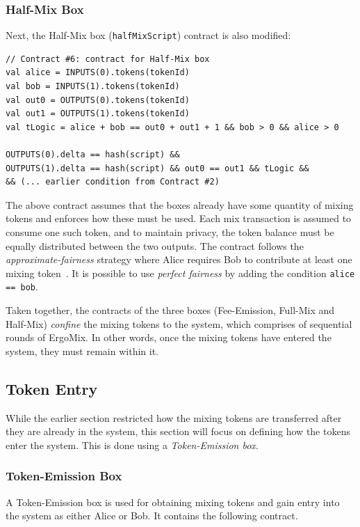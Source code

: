 \documentclass[11pt]{article}
\newcommand{\mixname}{ErgoMix\xspace}
\begin{document}
\subsubsection{Half-Mix Box}
Next, the Half-Mix box (\texttt{halfMixScript}) contract is also modified:
{\small
\begin{Verbatim}[frame=single]
// Contract #6: contract for Half-Mix box
val alice = INPUTS(0).tokens(tokenId)
val bob = INPUTS(1).tokens(tokenId)
val out0 = OUTPUTS(0).tokens(tokenId)
val out1 = OUTPUTS(1).tokens(tokenId)
val tLogic = alice + bob == out0 + out1 + 1 && bob > 0 && alice > 0 
  
OUTPUTS(0).delta == hash(script) && 
OUTPUTS(1).delta == hash(script) && out0 == out1 && tLogic &&
&& (... earlier condition from Contract #2)
\end{Verbatim}
}

The above contract assumes that the boxes already have some quantity of mixing tokens and enforces how these must be used. Each mix transaction is assumed to consume one such token, and to maintain privacy, the token balance must be equally distributed between the two outputs. The contract follows the {\em approximate-fairness} strategy where Alice requires Bob to contribute at least one mixing token~\cite{advtutorial}. It is possible to use {\em perfect fairness} by adding the condition \texttt{alice == bob}. 

Taken together, the contracts of the three boxes (Fee-Emission, Full-Mix and Half-Mix) {\em confine} the mixing tokens to the system, which comprises of sequential rounds of \mixname. In other words, once the mixing tokens have entered the system, they must remain within it. 

\subsection{Token Entry}

While the earlier section restricted how the mixing tokens are transferred after they are already in the system, this section will focus on defining how the tokens enter the system. This is done using a {\em Token-Emission box}. 

\subsubsection{Token-Emission Box}

A Token-Emission box is used for obtaining mixing tokens and gain entry into the system as either Alice or Bob. It contains the following contract. 
\end{document}
